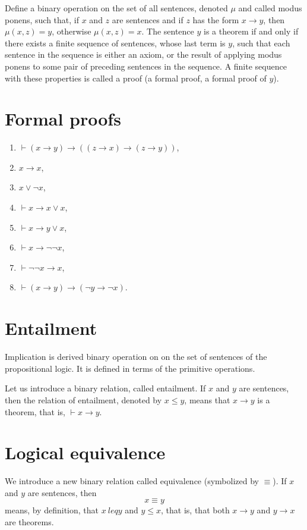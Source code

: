\documentclass[letterpaper, 10pt]{article}
\theoremstyle{definition}
\renewcommand{\implies}{\rightarrow}
\newcommand{\entails}{\vdash}
\begin{document}
Define a binary operation on the set of all sentences, denoted $\mu$ and called
modus ponens, such that, if $x$ and $z$ are sentences and if $z$ has the form $x
\implies y$, then $\mu(x,z) = y$, otherwise $\mu(x,z) = x$.
The sentence $y$ is a theorem if and only if there exists a finite sequence of
sentences, whose last term is $y$, such that each sentence in the sequence is
either an axiom, or the result of applying modus ponens to some pair of
preceding sentences in the sequence. A finite sequence with these properties is
called a proof (a formal proof, a formal proof of $y$).

\section{Formal proofs}

\begin{enumerate}[label=T\arabic*, left=0pt, resume]
	\item $\entails (x \implies y) \implies ((z \implies x) \implies (z \implies
		y))$,
	\item $x \implies x$,
	\item $x \lor \neg x$,
	\item $\entails x \implies x \lor x$,
	\item $\entails x \implies y \lor x$, 
	\item $\entails x \implies \neg \neg x$, 
	\item $\entails \neg \neg x \implies x$, 
	\item $\entails (x \implies y) \implies (\neg y \implies \neg x)$.
\end{enumerate}
\section{Entailment}

Implication is derived binary operation on on the set of sentences of the
propositional logic. It is defined in terms of the primitive operations.

Let us introduce a binary relation, called entailment. If $x$ and $y$ are
sentences, then the relation of entailment, denoted by $x \leq y$, means that $x
\implies y$ is a theorem, that is, $\entails x \implies y$.

\section{Logical equivalence}

We introduce a new binary relation called equivalence (symbolized by $\equiv$).
If $x$ and $y$ are sentences, then
\begin{equation*}
	x \equiv y
\end{equation*}
means, by definition, that $x\ leq y$ and $y \leq x$, that is, that both $x
\implies y$ and $y \implies x$ are theorems.
\end{document}
